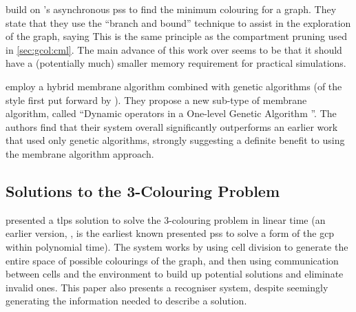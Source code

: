 
\citeauthor{Umetsu2019} \cite{Umetsu2019} build on \cite{Tanaka2012}'s asynchronous \glspl{ps} to find the minimum colouring for a graph.  They state that they use the ``branch and bound'' technique to assist in the exploration of the graph, saying   This is the same principle as the \gls{compartment} pruning used in \cref{sec:gcol:cml}.  The main advance of this work over \cite{Tanaka2012} seems to be that it should have a (potentially much) smaller memory requirement for practical simulations.  %


\citeauthor{Andreu-Guzman2020} \cite{Andreu-Guzman2020} employ a hybrid membrane algorithm combined with genetic algorithms (of the style first put forward by \citeauthor{Nishida2006} \cite{Nishida2006}).  They propose a new sub-type of membrane algorithm, called ``Dynamic operators in a One-level Genetic Algorithm ''.  The authors find that their system overall significantly outperforms an earlier work that used only genetic algorithms, strongly suggesting a definite benefit to using the membrane algorithm approach.


\subsection{\label{sec:gcol:3colsol}Solutions to the 3-Colouring Problem}


\citeauthor{Diaz-Pernil2008} \cite{Diaz-Pernil2008} presented a \gls{tlps} solution to solve the 3-colouring problem in linear time (an earlier version, \cite{Diaz-Pernil2007}, is the earliest known presented \glspl{ps} to solve a form of the \gls{gcp} within polynomial time).  The system works by using cell division to generate the entire space of possible colourings of the graph, and then using communication between cells and the environment to build up potential solutions and eliminate invalid ones.  This paper also presents a recogniser system, despite seemingly generating the information needed to describe a solution.

